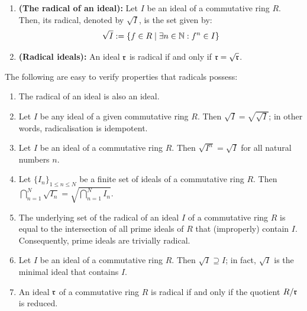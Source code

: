                \begin{definition} \label{def: radicals}
                    \noindent
                    \begin{enumerate}
                        \item \textbf{(The radical of an ideal):} Let $I$ be an ideal of a commutative ring $R$. Then, its radical, denoted by $\sqrt{I}$, is the set given by:
                            $$\sqrt{I} := \{f \in R \mid \exists n \in \mathbb{N}: f^n \in I\}$$
                        \item \textbf{(Radical ideals):} An ideal $\mathfrak{r}$ is radical if and only if $\mathfrak{r} = \sqrt{\mathfrak{r}}$. 
                    \end{enumerate}
                \end{definition}
                \begin{proposition} \label{prop: radical_properties}
                    The following are easy to verify properties that radicals possess:
                        \begin{enumerate}
                            \item The radical of an ideal is also an ideal.
                            \item Let $I$ be any ideal of a given commutative ring $R$. Then $\sqrt{I} = \sqrt{\sqrt{I}}$; in other words, radicalisation is idempotent.
                            \item Let $I$ be an ideal of a commutative ring $R$. Then $\sqrt{I^n} = \sqrt{I}$ for all natural numbers $n$. 
                            \item Let $\{I_n\}_{1 \leq n \leq N}$ be a finite set of ideals of a commutative ring $R$. Then $\bigcap_{n = 1}^N \sqrt{I_n} = \sqrt{\bigcap_{n = 1}^N I_n}$. 
                            \item The underlying set of the radical of an ideal $I$ of a commutative ring $R$ is equal to the intersection of all prime ideals of $R$ that (improperly) contain $I$. Consequently, prime ideals are trivially radical.
                            \item  Let $I$ be an ideal of a commutative ring $R$. Then $\sqrt{I} \supseteq I$; in fact, $\sqrt{I}$ is the minimal ideal that contains $I$. 
                            \item An ideal $\mathfrak{r}$ of a commutative ring $R$ is radical if and only if the quotient $R/\mathfrak{r}$ is reduced.
                        \end{enumerate}
                \end{proposition}
